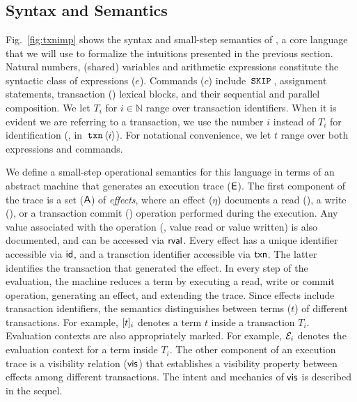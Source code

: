 \section{\txnimp}
\label{sec:opsem}



\subsection{Syntax and Semantics}
\label{sec:syntax}

Fig.~\ref{fig:txnimp} shows the syntax and small-step semantics of
\txnimp, a core language that we will use to formalize the intuitions
presented in the previous section. Natural numbers, (shared) variables
and arithmetic expressions constitute the syntactic class of
expressions ($e$).  Commands ($c$) include $\,{\tt SKIP}\,$, assignment
statements, transaction () lexical blocks, and their sequential
and parallel composition. We let $T_i$ for $i \in \mathbb{N}$ range
over transaction identifiers. When it is evident we are referring to a
transaction, we use the number $i$ instead of $T_i$ for identification
(\eg, in $\,{\tt txn}\,\langle i \rangle$). For notational convenience, we
let $t$ range over both expressions and commands.

We define a small-step operational semantics for this language in
terms of an abstract machine that generates an execution trace
($\textsf{E}$). The first component of the trace is a set ($\textsf{A}$) of
\emph{effects}, where an effect ($\eta$) documents a read (),
a write (), or a transaction commit () operation
performed during the execution. Any value associated with the
operation (\eg, value read or value written) is also documented, and
can be accessed via $\textsf{rval}$. Every effect has a unique identifier
accessible via $\textsf{id}$, and a transction identifier accessible via
$\textsf{txn}$.  The latter identifies the transaction that generated the
effect. In every step of the evaluation, the machine reduces a \txnimp
term by executing a read, write or commit operation, generating an
effect, and extending the trace. Since effects include transaction
identifiers, the semantics distinguishes between terms ($t$) of
different transactions. For example, $\lbrack t \rbrack_i$ denotes a term $t$
inside a transaction $T_i$.  Evaluation contexts are also
appropriately marked. For example, $\mathcal{E}_i$ denotes the evaluation
context for a term inside $T_i$. The other component of an execution
trace is a visibility relation ($\textsf{vis}$) that establishes a visibility
property between effects among different transactions. The intent and
mechanics of $\textsf{vis}$ is described in the sequel.

